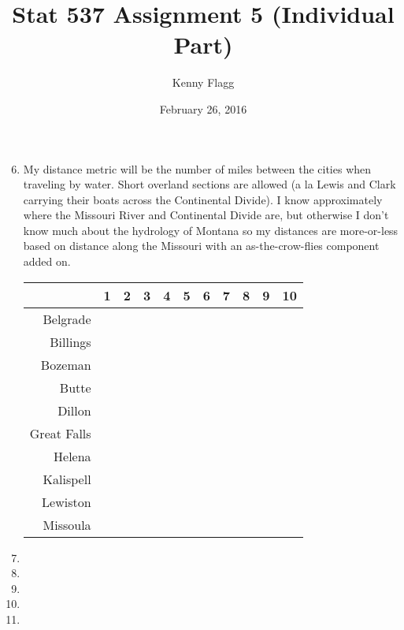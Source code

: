 \documentclass[11pt]{article}\usepackage[]{graphicx}\usepackage[]{color}
\title{Stat 537 Assignment 5 (Individual Part)}
\author{Kenny Flagg}
\date{February 26, 2016}
\begin{document}
\maketitle



\begin{enumerate}

\setcounter{enumi}{5}
\item %
My distance metric will be the number of miles between the cities when
traveling by water. Short overland sections are allowed (a la Lewis and Clark
carrying their boats across the Continental Divide). I know approximately where
the Missouri River and Continental Divide are, but otherwise I don't know much
about the hydrology of Montana so my distances are more-or-less based on
distance along the Missouri with an as-the-crow-flies component added on.

\begin{table}[ht]
\centering
\begin{tabular}{rllllllllll}
  \hline
 & 1 & 2 & 3 & 4 & 5 & 6 & 7 & 8 & 9 & 10 \\ 
  \hline
Belgrade &  &  &  &  &  &  &  &  &  &  \\ 
  Billings &  &  &  &  &  &  &  &  &  &  \\ 
  Bozeman &  &  &  &  &  &  &  &  &  &  \\ 
  Butte &  &  &  &  &  &  &  &  &  &  \\ 
  Dillon &  &  &  &  &  &  &  &  &  &  \\ 
  Great Falls &  &  &  &  &  &  &  &  &  &  \\ 
  Helena &  &  &  &  &  &  &  &  &  &  \\ 
  Kalispell &  &  &  &  &  &  &  &  &  &  \\ 
  Lewiston &  &  &  &  &  &  &  &  &  &  \\ 
  Missoula &  &  &  &  &  &  &  &  &  &  \\ 
   \hline
\end{tabular}
\end{table}


\item %

\item %

\item %

\item %

\item %

\end{enumerate}
\end{document}
